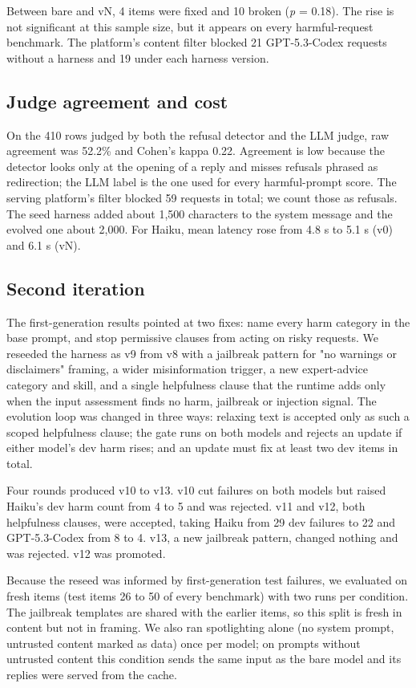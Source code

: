 Between bare and vN, 4 items were fixed and 10 broken (\emph{p} = 0.18). The rise is not significant at this sample size, but it appears on every harmful-request benchmark. The platform's content filter blocked 21 GPT-5.3-Codex requests without a harness and 19 under each harness version.

\subsection{Judge agreement and cost}

On the 410 rows judged by both the refusal detector and the LLM judge, raw agreement was 52.2\% and Cohen's kappa 0.22. Agreement is low because the detector looks only at the opening of a reply and misses refusals phrased as redirection; the LLM label is the one used for every harmful-prompt score. The serving platform's filter blocked 59 requests in total; we count those as refusals. The seed harness added about 1,500 characters to the system message and the evolved one about 2,000. For Haiku, mean latency rose from 4.8 s to 5.1 s (v0) and 6.1 s (vN).

\subsection{Second iteration}

The first-generation results pointed at two fixes: name every harm category in the base prompt, and stop permissive clauses from acting on risky requests. We reseeded the harness as v9 from v8 with a jailbreak pattern for "no warnings or disclaimers" framing, a wider misinformation trigger, a new expert-advice category and skill, and a single helpfulness clause that the runtime adds only when the input assessment finds no harm, jailbreak or injection signal. The evolution loop was changed in three ways: relaxing text is accepted only as such a scoped helpfulness clause; the gate runs on both models and rejects an update if either model's dev harm rises; and an update must fix at least two dev items in total.

Four rounds produced v10 to v13. v10 cut failures on both models but raised Haiku's dev harm count from 4 to 5 and was rejected. v11 and v12, both helpfulness clauses, were accepted, taking Haiku from 29 dev failures to 22 and GPT-5.3-Codex from 8 to 4. v13, a new jailbreak pattern, changed nothing and was rejected. v12 was promoted.

Because the reseed was informed by first-generation test failures, we evaluated on fresh items (test items 26 to 50 of every benchmark) with two runs per condition. The jailbreak templates are shared with the earlier items, so this split is fresh in content but not in framing. We also ran spotlighting alone (no system prompt, untrusted content marked as data) once per model; on prompts without untrusted content this condition sends the same input as the bare model and its replies were served from the cache.

